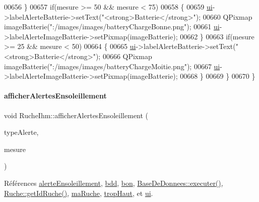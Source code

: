 \begin{DoxyCode}
00656         \}
00657         \textcolor{keywordflow}{if}(mesure >= 50 && mesure < 75)
00658         \{
00659             \hyperlink{class_ruche_ihm_a64786058bd7f88ca2f1e9743bb27c25b}{ui}->labelAlerteBatterie->setText(\textcolor{stringliteral}{"<strong>Batterie</strong>"});
00660             QPixmap imageBatterie(\textcolor{stringliteral}{":/images/images/batteryChargeBonne.png"});
00661             \hyperlink{class_ruche_ihm_a64786058bd7f88ca2f1e9743bb27c25b}{ui}->labelAlerteImageBatterie->setPixmap(imageBatterie);
00662         \}
00663         \textcolor{keywordflow}{if}(mesure >= 25 && mesure < 50)
00664         \{
00665             \hyperlink{class_ruche_ihm_a64786058bd7f88ca2f1e9743bb27c25b}{ui}->labelAlerteBatterie->setText(\textcolor{stringliteral}{"<strong>Batterie</strong>"});
00666             QPixmap imageBatterie(\textcolor{stringliteral}{":/images/images/batteryChargeMoitie.png"});
00667             \hyperlink{class_ruche_ihm_a64786058bd7f88ca2f1e9743bb27c25b}{ui}->labelAlerteImageBatterie->setPixmap(imageBatterie);
00668         \}
00669     \}
00670 \}
\end{DoxyCode}
\mbox{\label{class_ruche_ihm_aea5efc506f9825db2a4eb39a40d7eb18}} 
\paragraph{\texorpdfstring{afficher\+Alertes\+Ensoleillement}{afficherAlertesEnsoleillement}}
{\footnotesize\ttfamily void Ruche\+Ihm\+::afficher\+Alertes\+Ensoleillement (\begin{DoxyParamCaption}\item[{\hyperlink{parametres_8h_aaa6de8207c94675264c90b10b613368d}{Seuils\+Alertes}}]{type\+Alerte,  }\item[{double}]{mesure }\end{DoxyParamCaption})\hspace{0.3cm}{\ttfamily [slot]}}



Références \hyperlink{parametres_8h_a83a725fd153179a2bd97afcc8307737ba256a82c8886c1902dc7a078868434f83}{alerte\+Ensoleillement}, \hyperlink{class_ruche_ihm_a0851936fe212e8d40538264f09749153}{bdd}, \hyperlink{parametres_8h_aaa6de8207c94675264c90b10b613368da5ac8ec3b54d90a07c6bb5a77ef971821}{bon}, \hyperlink{class_base_de_donnees_aa8de5f8f8bb17edc43f5c0ee33712081}{Base\+De\+Donnees\+::executer()}, \hyperlink{class_ruche_a9f2de5ef29557ec7a53d5e22df34d164}{Ruche\+::get\+Id\+Ruche()}, \hyperlink{class_ruche_ihm_a43a6b1fa31f4fba58d919daae3707b38}{ma\+Ruche}, \hyperlink{parametres_8h_aaa6de8207c94675264c90b10b613368dabc650d9700ae19f2696e6a6e3f9ab067}{trop\+Haut}, et \hyperlink{class_ruche_ihm_a64786058bd7f88ca2f1e9743bb27c25b}{ui}.



